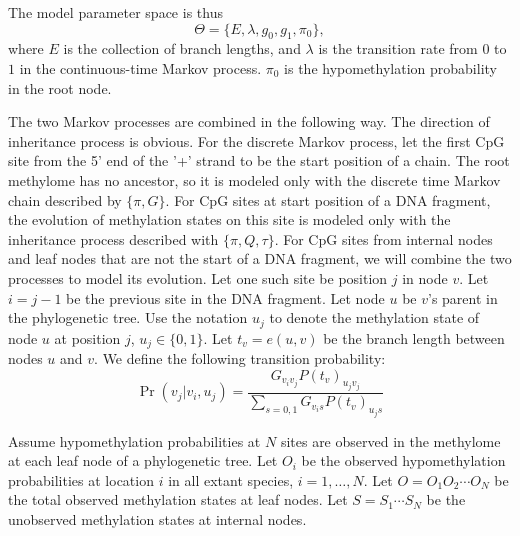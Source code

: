 \documentclass[11pt]{article}
\begin{document}
The model parameter space is thus $$\Theta=\{E,\lambda, g_0, g_1,
\pi_0\},$$ where $E$ is the collection of branch lengths, and
$\lambda$ is the transition rate from $0$ to $1$ in the
continuous-time Markov process. $\pi_0$ is the hypomethylation
probability in the root node.


The two Markov processes are combined in the following way. The
direction of inheritance process is obvious. For the discrete Markov
process, let the first CpG site from the 5' end of the '+' strand to
be the start position of a chain. The root methylome has no ancestor,
so it is modeled only with the discrete time Markov chain described by
$\{\pi, G\}$. For CpG sites at start position of a DNA fragment, the
evolution of methylation states on this site is modeled only with the
inheritance process described with $\{\pi, Q, \tau\}$. For CpG sites
from internal nodes and leaf nodes that are not the start of a DNA
fragment, we will combine the two processes to model its evolution. Let
one such site be position $j$ in node $v$. Let $i=j-1$ be the previous
site in the DNA fragment. Let node $u$ be $v$'s parent in the
phylogenetic tree. Use the notation $u_j$ to denote the methylation state
of node $u$ at position $j$, $u_j\in\{0,1\}$. Let $t_v=e(u,v)$ be the
branch length between nodes $u$ and $v$. We define the following
transition probability:
\begin{equation}
\Pr(v_j|v_i,u_j)=  \frac{G_{v_iv_j}P(t_v)_{u_jv_j}}{\sum_{s=0,1}G_{v_is}P(t_v)_{u_js}}
\end{equation}

Assume hypomethylation probabilities at $N$ sites are observed in the
methylome at each leaf node of a phylogenetic tree. Let $O_i$ be the
observed hypomethylation probabilities at location $i$ in all extant
species, $i=1,\ldots, N$. Let $O=O_1O_2\cdots O_N$ be the total
observed methylation states at leaf nodes.  Let $S=S_1\cdots S_N$ be
the unobserved methylation states at internal nodes.
\end{document}

